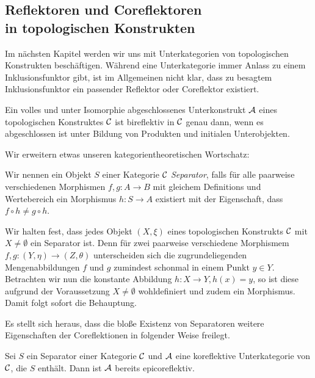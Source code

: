 \subsection[Reflektoren und Coreflektoren in topologischen Konstrukten]{Reflektoren und Coreflektoren\\ in topologischen Konstrukten}

Im nächsten Kapitel werden wir uns mit Unterkategorien von topologischen Konstrukten beschäftigen. Während eine Unterkategorie immer Anlass zu einem Inklusionsfunktor gibt, ist im Allgemeinen nicht klar, dass zu besagtem Inklusionsfunktor ein passender Reflektor oder Coreflektor existiert. 

\begin{kor}
  Ein volles und unter Isomorphie abgeschlossenes Unterkonstrukt $\mathcal{A}$ eines topologischen Konstruktes $\mathcal{C}$ ist bireflektiv in $\mathcal{C}$ genau dann, wenn es abgeschlossen ist unter Bildung von Produkten und initialen Unterobjekten.
\end{kor}

Wir erweitern etwas unseren kategorientheoretischen Wortschatz:

\begin{defn}
  Wir nennen ein Objekt $S$ einer Kategorie $\mathcal{C}$ \emph{Separator}, falls für alle paarweise verschiedenen Morphismen $f,g \colon A \to B$ mit gleichem Definitions und Wertebereich ein Morphismus $h \colon S \to A$ existiert mit der Eigenschaft, dass $f \circ h \neq g \circ h$.
\end{defn}

Wir halten fest, dass jedes Objekt $(X,\xi)$ eines topologischen Konstrukts $\mathcal{C}$ mit $X \neq \emptyset$ ein Separator ist. 
Denn für zwei paarweise verschiedene Morphismem $f,g \colon (Y, \eta) \to (Z, \theta)$ unterscheiden sich die zugrundeliegenden Mengenabbildungen $f$ und $g$ zumindest schonmal in einem Punkt $y \in Y$. Betrachten wir nun die konstante Abbildung $h \colon X \to Y, h(x) = y$, so ist diese aufgrund der Voraussetzung $X \neq \emptyset$ wohldefiniert und zudem ein Morphismus.
Damit folgt sofort die Behauptung.

Es stellt sich heraus, dass die bloße Existenz von Separatoren weitere Eigenschaften der Coreflektionen in folgender Weise freilegt.

\begin{thm}
  Sei $S$ ein Separator einer Kategorie $\mathcal{C}$ und $\mathcal{A}$ eine koreflektive Unterkategorie von $\mathcal{C}$, die $S$ enthält.
  Dann ist $\mathcal{A}$ bereits epicoreflektiv.
\end{thm}

